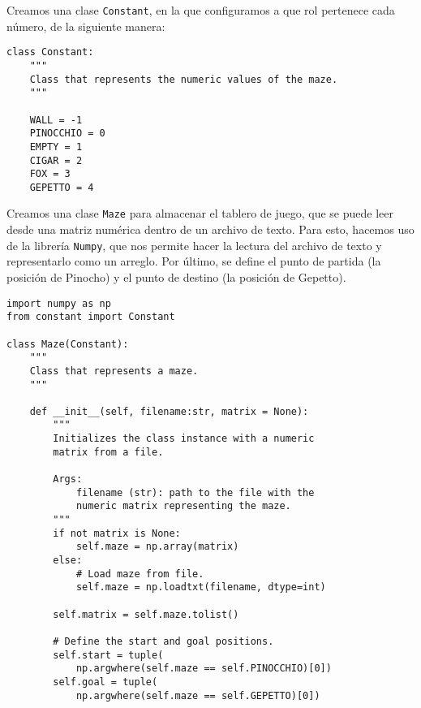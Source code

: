 Creamos una clase \lstinline{Constant}, en la que configuramos a que rol pertenece cada número, de la siguiente manera:\\
\begin{lstlisting}
class Constant:
    """
    Class that represents the numeric values of the maze.
    """

    WALL = -1
    PINOCCHIO = 0
    EMPTY = 1
    CIGAR = 2
    FOX = 3
    GEPETTO = 4
\end{lstlisting}
\clearpage
Creamos una clase \lstinline{Maze} para almacenar el tablero de juego, que se puede leer desde una matriz numérica dentro de un archivo de texto. Para esto, hacemos uso de la librería \lstinline{Numpy}, que nos permite hacer la lectura del archivo de texto y representarlo como un arreglo. Por último, se define el punto de partida (la posición de Pinocho) y el punto de destino (la posición de Gepetto).\\
\begin{lstlisting}
import numpy as np
from constant import Constant

class Maze(Constant):
    """
    Class that represents a maze.
    """

    def __init__(self, filename:str, matrix = None):
        """
        Initializes the class instance with a numeric
        matrix from a file.

        Args:
            filename (str): path to the file with the
            numeric matrix representing the maze.
        """
        if not matrix is None:
            self.maze = np.array(matrix)
        else:
            # Load maze from file.
            self.maze = np.loadtxt(filename, dtype=int)
            
        self.matrix = self.maze.tolist()

        # Define the start and goal positions.
        self.start = tuple(
            np.argwhere(self.maze == self.PINOCCHIO)[0])
        self.goal = tuple(
            np.argwhere(self.maze == self.GEPETTO)[0])
\end{lstlisting}
\clearpage